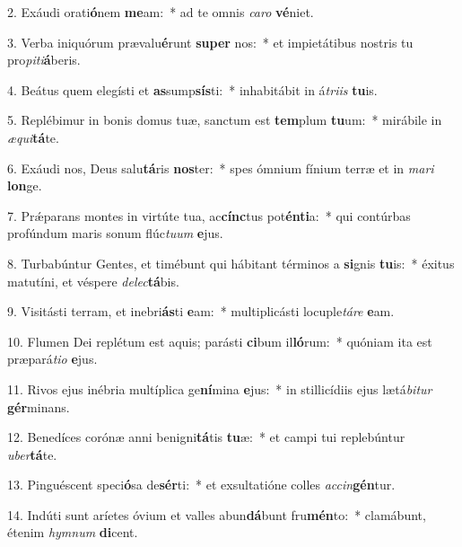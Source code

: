 2. Exáudi orati\textbf{ó}nem \textbf{me}am:~*  ad te omnis \textit{ca}\textit{ro} \textbf{vé}niet.\

3. Verba iniquórum prævalu\textbf{é}runt \textbf{su}\textbf{per} nos:~*  et impietátibus nostris tu pro\textit{pi}\textit{ti}\textbf{á}beris.\

4. Beátus quem elegísti et \textbf{as}sump\textbf{sís}ti:~*  inhabitábit in á\textit{tri}\textit{is} \textbf{tu}is.\

5. Replébimur in bonis domus tuæ, sanctum est \textbf{tem}plum \textbf{tu}um:~*  mirábile in \textit{æ}\textit{qui}\textbf{tá}te.\

6. Exáudi nos, Deus salu\textbf{tá}ris \textbf{nos}ter:~*  spes ómnium fínium terræ et in \textit{ma}\textit{ri} \textbf{lon}ge.\

7. Prǽparans montes in virtúte tua, ac\textbf{cínc}tus pot\textbf{én}\textbf{ti}a:~*  qui contúrbas profúndum maris sonum flúc\textit{tu}\textit{um} \textbf{e}jus.\

8. Turbabúntur Gentes, et timébunt qui hábitant términos a \textbf{si}gnis \textbf{tu}is:~*  éxitus matutíni, et véspere \textit{de}\textit{lec}\textbf{tá}bis.\

9. Visitásti terram, et inebri\textbf{ás}ti \textbf{e}am:~*  multiplicásti locuple\textit{tá}\textit{re} \textbf{e}am.\

10. Flumen Dei replétum est aquis; parásti \textbf{ci}bum il\textbf{ló}rum:~*  quóniam ita est præpará\textit{ti}\textit{o} \textbf{e}jus.\

11. Rivos ejus inébria multíplica ge\textbf{ní}mina \textbf{e}jus:~*  in stillicídiis ejus lætá\textit{bi}\textit{tur} \textbf{gér}minans.\

12. Benedíces corónæ anni benigni\textbf{tá}tis \textbf{tu}æ:~*  et campi tui replebúntur \textit{u}\textit{ber}\textbf{tá}te.\

13. Pinguéscent speci\textbf{ó}sa de\textbf{sér}ti:~*  et exsultatióne colles \textit{ac}\textit{cin}\textbf{gén}tur.\

14. Indúti sunt aríetes óvium et valles abun\textbf{dá}bunt fru\textbf{mén}to:~*  clamábunt, étenim \textit{hym}\textit{num} \textbf{di}cent.\

